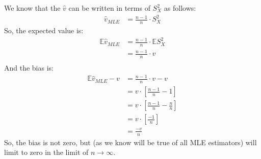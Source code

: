 We know that the $\hat{v}$ can be written in terms of $S_X^2$ as follows:
\begin{align*}
\hat{v}_{MLE} &= \frac{n-1}{n} \cdot S_X^2
\end{align*}
So, the expected value is:
\begin{align*}
\mathbb{E}\hat{v}_{MLE} &= \frac{n-1}{n} \cdot \mathbb{E} S_X^2 \\
&= \frac{n-1}{n} \cdot v \\
\end{align*}
And the bias is:
\begin{align*}
\mathbb{E}\hat{v}_{MLE} - v &= \frac{n-1}{n} \cdot v - v \\
&= v \cdot \left[\frac{n-1}{n} - 1 \right] \\
&= v \cdot \left[\frac{n-1}{n} - \frac{n}{n} \right] \\
&= v \cdot \left[\frac{-1}{n} \right] \\
&= \frac{-v}{n}
\end{align*}
So, the bias is not zero, but (as we know will be true of all MLE estimators)
will limit to zero in the limit of $n\rightarrow \infty$.

